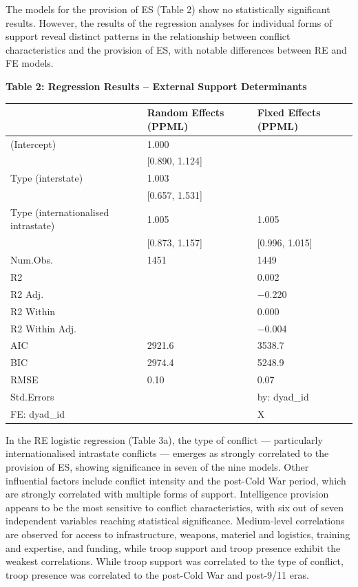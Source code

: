 \documentclass[
]{article}
\begin{document}
The models for the provision of ES (Table 2) show no statistically
significant results. However, the results of the regression analyses for
individual forms of support reveal distinct patterns in the relationship
between conflict characteristics and the provision of ES, with notable
differences between RE and FE models.

\newpage

\noindent\textbf{Table 2: Regression Results – External Support Determinants}

\begin{tabular}{lll}
\hline
& Random Effects (PPML) & Fixed Effects (PPML) \\ \hline
(Intercept) & \num{1.000} &  \\
& [\num{0.890}, \num{1.124}] &  \\
Type (interstate) & \num{1.003} &  \\
& [\num{0.657}, \num{1.531}] &  \\
Type (internationalised intrastate) & \num{1.005} & \num{1.005} \\
& [\num{0.873}, \num{1.157}] & [\num{0.996}, \num{1.015}] \\
Num.Obs. & \num{1451} & \num{1449} \\
R2 &  & \num{0.002} \\
R2 Adj. &  & \num{-0.220} \\
R2 Within &  & \num{0.000} \\
R2 Within Adj. &  & \num{-0.004} \\
AIC & \num{2921.6} & \num{3538.7} \\
BIC & \num{2974.4} & \num{5248.9} \\
RMSE & \num{0.10} & \num{0.07} \\
Std.Errors &  & by: dyad\_id \\
FE: dyad\_id &  & X \\
\hline
\end{tabular}

In the RE logistic regression (Table 3a), the type of conflict ---
particularly internationalised intrastate conflicts --- emerges as
strongly correlated to the provision of ES, showing significance in
seven of the nine models. Other influential factors include conflict
intensity and the post-Cold War period, which are strongly correlated
with multiple forms of support. Intelligence provision appears to be the
most sensitive to conflict characteristics, with six out of seven
independent variables reaching statistical significance. Medium-level
correlations are observed for access to infrastructure, weapons,
materiel and logistics, training and expertise, and funding, while troop
support and troop presence exhibit the weakest correlations. While troop
support was correlated to the type of conflict, troop presence was
correlated to the post-Cold War and post-9/11 eras.
\end{document}

